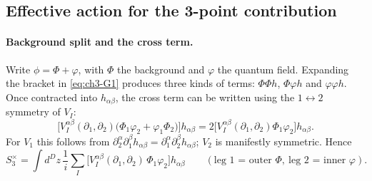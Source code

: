 \subsection{Effective action for the 3-point contribution \tD}

\paragraph{Background split and the cross term.}
Write $\phi=\Phi+\varphi$, with $\Phi$ the background and $\varphi$ the quantum field. Expanding the bracket in \eqref{eq:ch3-G1} produces three
kinds of terms: $\Phi\Phi h$, $\Phi\varphi h$ and $\varphi\varphi h$. Once contracted into $h_{\alpha\beta}$, the cross term can be written using the
$1\leftrightarrow2$ symmetry of $V_I$:
\begin{equation}
\big[V_I^{\alpha\beta}(\partial_1,\partial_2)\big(\Phi_1\varphi_2+\varphi_1\Phi_2\big)\big]h_{\alpha\beta}=2\big[V_I^{\alpha\beta}(\partial_1,\partial_2)\Phi_1\varphi_2\big]h_{\alpha\beta}.
\label{eq:ch3-cross}
\end{equation}
For $V_1$ this follows from $\partial_2^\alpha\partial_1^\beta h_{\alpha\beta}=\partial_1^\alpha\partial_2^\beta h_{\alpha\beta}$; $V_2$ is manifestly symmetric. Hence
\begin{equation}
S_3^{\times}=\int d^Dz\,\frac1i\sum_I\big[V_I^{\alpha\beta}(\partial_1,\partial_2)\,\Phi_1\varphi_2\big]h_{\alpha\beta}
\qquad(\text{leg 1 = outer }\Phi,\ \text{leg 2 = inner }\varphi).
\label{eq:ch3-S3x}
\end{equation}

